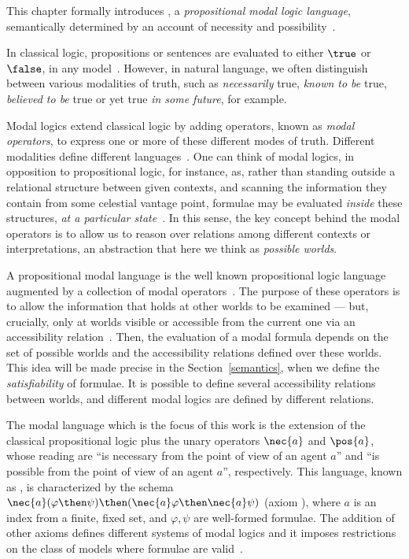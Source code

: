 This chapter formally introduces , a \emph{propositional modal
logic language}, semantically determined by an account of necessity and
possibility~\cite{journals/jal/NalonD07}.

In classical logic, propositions or sentences are evaluated to either $\true$ or
$\false$, in any model~\cite{kleene2002mathematical}. However, in natural
language, we often distinguish between various modalities of truth, such as
\emph{necessarily} true, \emph{known to be} true, \emph{believed to be} true or
yet true \emph{in some future}, for example. 

Modal logics extend classical logic by adding operators, known as
\emph{modal operators}, to express one or more of these different modes of truth.
Different modalities define different languages~\cite{blackburn2002modal}. One
can think of modal logics, in opposition to propositional logic, for instance,
as, rather than standing outside a relational structure between given contexts,
and scanning the information they contain from some celestial vantage point,
formulae may be evaluated \emph{inside} these structures, \emph{at a particular
state}~\cite{blackburn2002modal}. In this sense, the key concept behind the
modal operators is to allow us to reason over relations among different contexts or
interpretations, an abstraction that here we think as \emph{possible worlds}. 

A propositional modal language is the well known propositional logic language
augmented by a collection of modal operators~\cite{blackburn2002modal}.
The purpose of these operators is to allow the information that holds at
other worlds to be examined --- but, crucially, only at worlds visible or
accessible from the current one via an accessibility
relation~\cite{blackburn2002modal}. Then, the evaluation of a modal formula
depends on the set of possible worlds and the accessibility relations defined
over these worlds. This idea will be made precise in the
Section~\ref{semantics}, when we define the \emph{satisfiability} of
formulae.  It is possible to define several accessibility relations between
worlds, and different modal logics are defined by different relations.

The modal language which is the focus of this work is the extension of the
classical propositional logic plus the unary operators $\nec{a}$ and $\pos{a}$,
whose reading are ``is necessary from the point of view of an agent $a$'' and
``is possible from the point of view of an agent $a$'', respectively. This
language, known as , is characterized by the schema
$\nec{a}(\varphi \then \psi) \then (\nec{a} \varphi \then \nec{a} \psi)$ (axiom
), where $a$ is an index from a finite, fixed set, and $\varphi,
\psi$ are well-formed formulae. The addition of other axioms defines different
systems of modal logics and it imposes restrictions on the class of models where
formulae are valid~\cite{chellas:modal_logic}. 

